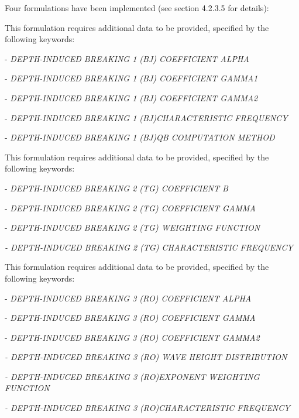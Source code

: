  Four formulations have been implemented (see section 4.2.3.5 for details):

 \textbf{}

 This formulation requires additional data to be provided, specified by the following keywords:

 - \textit{DEPTH-INDUCED BREAKING 1 (BJ) COEFFICIENT ALPHA}

 - \textit{DEPTH-INDUCED BREAKING 1 (BJ) COEFFICIENT GAMMA1}

 - \textit{DEPTH-INDUCED BREAKING 1 (BJ) COEFFICIENT GAMMA2}

 - \textit{DEPTH-INDUCED BREAKING 1 (BJ)CHARACTERISTIC FREQUENCY }

 - \textit{DEPTH-INDUCED BREAKING 1 (BJ)QB COMPUTATION METHOD}

 \textit{}

 \textbf{}

 This formulation requires additional data to be provided, specified by the following keywords:

 - \textit{DEPTH-INDUCED BREAKING 2 (TG) COEFFICIENT B}

 - \textit{DEPTH-INDUCED BREAKING 2 (TG) COEFFICIENT GAMMA}

 - \textit{DEPTH-INDUCED BREAKING 2 (TG) WEIGHTING FUNCTION}

 \textit{- DEPTH-INDUCED BREAKING 2 (TG) CHARACTERISTIC FREQUENCY}

 \textbf{}

 \textbf{}

 This formulation requires additional data to be provided, specified by the following keywords:

 - \textit{DEPTH-INDUCED BREAKING 3 (RO) COEFFICIENT ALPHA}

 - \textit{DEPTH-INDUCED BREAKING 3 (RO) COEFFICIENT GAMMA}

 - \textit{DEPTH-INDUCED BREAKING 3 (RO) COEFFICIENT GAMMA2}

 \textit{- DEPTH-INDUCED BREAKING 3 (RO) WAVE HEIGHT DISTRIBUTION}

 \textit{- DEPTH-INDUCED BREAKING 3 (RO)EXPONENT WEIGHTING FUNCTION}

 \textit{- DEPTH-INDUCED BREAKING 3 (RO)CHARACTERISTIC FREQUENCY}

 \textbf{}

 \textbf{}

